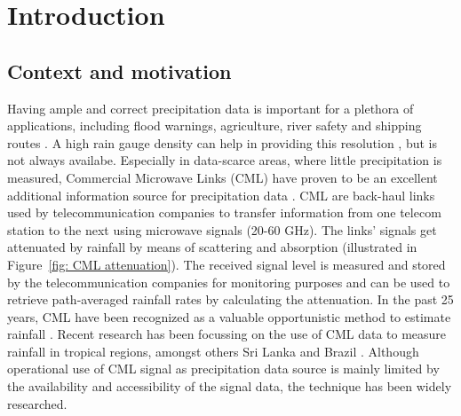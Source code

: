 \documentclass[twocolumn, 10pt, a4paper]{memoir}
\begin{document}
	
	
	\cleardoublepage
	
	\pagestyle{ruled}
	\mainmatter          
	
	\chapter{Introduction}\vspace{-6mm}
	\section{Context and motivation}
	
	Having ample and correct precipitation data is important for a plethora of applications, including flood warnings, agriculture, river safety and shipping routes . A high rain gauge density can help in providing this resolution , but is not always availabe. Especially in data-scarce areas, where little precipitation is measured, Commercial Microwave Links (CML) have proven to be an excellent additional information source for precipitation data . CML are back-haul links used by telecommunication companies to transfer information from one telecom station to the next using microwave signals (20-60 GHz). The links' signals get attenuated by rainfall by means of scattering and absorption (illustrated in Figure~\ref{fig: CML attenuation}). The received signal level is measured and stored by the telecommunication companies for monitoring purposes and can be used to retrieve path-averaged rainfall rates by calculating the attenuation. In the past 25 years, CML have been recognized as a valuable opportunistic method to estimate rainfall . Recent research has been focussing on the use of CML data to measure rainfall in tropical regions, amongst others Sri Lanka \cite{Overeem2021} and Brazil \cite{RiosGaona2017a}. Although operational use of CML signal as precipitation data source is mainly limited by the availability and accessibility of the signal data, the technique has been widely researched.
	
\end{document}
